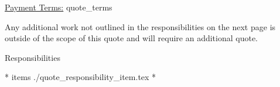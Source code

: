 \documentclass{letter}
\begin{document}
\vspace{3 cm}

\underline{Payment Terms:} {{ quote_terms }}

\vspace{0.5 cm}

\small{Any additional work not outlined in the responsibilities on the next page is outside of the scope of this quote and will require an additional quote.}

\newpage

\Large{Responsibilities}

\begin{itemize}
  {* items ./quote_responsibility_item.tex *}
\end{itemize}
\end{document}
